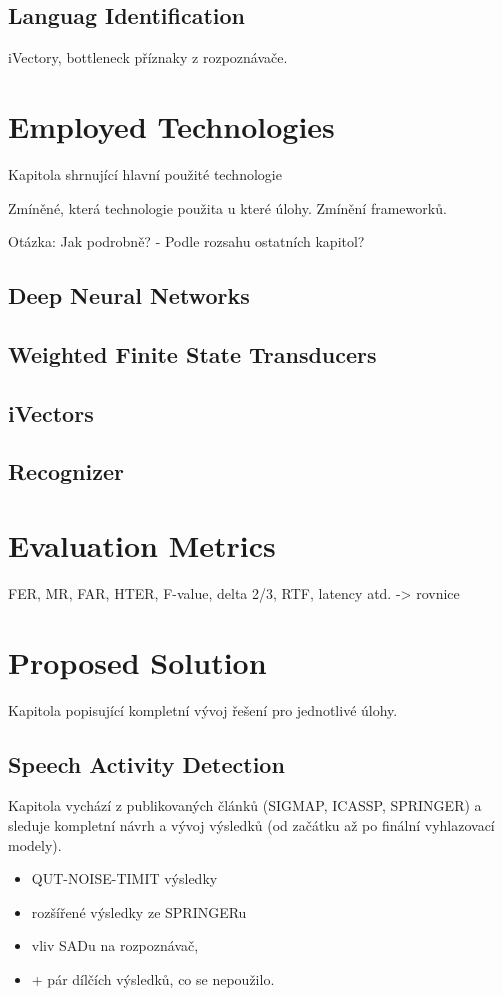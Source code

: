 \documentclass[FM,noheader,EN]{tulthesis}
\begin{document}
\section{Languag Identification}
\label{s:theory:lid}
iVectory, bottleneck příznaky z rozpoznávače.


\chapter{Employed Technologies}
\label{ch:technologies}
Kapitola shrnující hlavní použité technologie

Zmíněné, která technologie použita u které úlohy.
Zmínění frameworků.

Otázka: Jak podrobně? 
- Podle rozsahu ostatních kapitol?

\section{Deep Neural Networks}
\section{Weighted Finite State Transducers}
\section{iVectors}
\section{Recognizer}


\chapter{Evaluation Metrics}
\label{ch:metrics}
FER, MR, FAR, HTER, F-value, delta 2/3, RTF, latency atd. -> rovnice


\chapter{Proposed Solution}
\label{ch:solution}
Kapitola popisující kompletní vývoj řešení pro jednotlivé úlohy.

\section{Speech Activity Detection}
\label{ch:solution:sad}
Kapitola vychází z publikovaných článků (SIGMAP, ICASSP, SPRINGER) a sleduje kompletní návrh a vývoj výsledků (od začátku až po finální vyhlazovací modely).
\begin{itemize}
	\item QUT-NOISE-TIMIT výsledky
	\item rozšířené výsledky ze SPRINGERu
	\item vliv SADu na rozpoznávač, 
	\item + pár dílčích výsledků, co se nepoužilo.
\end{itemize}	
\end{document}
